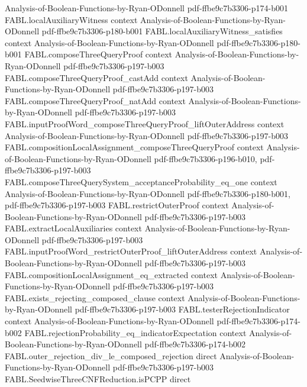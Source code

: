 \begin{theorem}
  {Analysis-of-Boolean-Functions-by-Ryan-ODonnell}
  {pdf-ffbe9c7b3306-p174-b001}
\proofstep
  {FABL.localAuxiliaryWitness}
  {context}
  {Analysis-of-Boolean-Functions-by-Ryan-ODonnell}
  {pdf-ffbe9c7b3306-p180-b001}
\proofstep
  {FABL.localAuxiliaryWitness_satisfies}
  {context}
  {Analysis-of-Boolean-Functions-by-Ryan-ODonnell}
  {pdf-ffbe9c7b3306-p180-b001}
\proofstep
  {FABL.composeThreeQueryProof}
  {context}
  {Analysis-of-Boolean-Functions-by-Ryan-ODonnell}
  {pdf-ffbe9c7b3306-p197-b003}
\proofstep
  {FABL.composeThreeQueryProof_castAdd}
  {context}
  {Analysis-of-Boolean-Functions-by-Ryan-ODonnell}
  {pdf-ffbe9c7b3306-p197-b003}
\proofstep
  {FABL.composeThreeQueryProof_natAdd}
  {context}
  {Analysis-of-Boolean-Functions-by-Ryan-ODonnell}
  {pdf-ffbe9c7b3306-p197-b003}
\proofstep
  {FABL.inputProofWord_composeThreeQueryProof_liftOuterAddress}
  {context}
  {Analysis-of-Boolean-Functions-by-Ryan-ODonnell}
  {pdf-ffbe9c7b3306-p197-b003}
\proofstep
  {FABL.compositionLocalAssignment_composeThreeQueryProof}
  {context}
  {Analysis-of-Boolean-Functions-by-Ryan-ODonnell}
  {pdf-ffbe9c7b3306-p196-b010,
    pdf-ffbe9c7b3306-p197-b003}
\proofstep
  {FABL.composeThreeQuerySystem_acceptanceProbability_eq_one}
  {context}
  {Analysis-of-Boolean-Functions-by-Ryan-ODonnell}
  {pdf-ffbe9c7b3306-p180-b001,
    pdf-ffbe9c7b3306-p197-b003}
\proofstep
  {FABL.restrictOuterProof}
  {context}
  {Analysis-of-Boolean-Functions-by-Ryan-ODonnell}
  {pdf-ffbe9c7b3306-p197-b003}
\proofstep
  {FABL.extractLocalAuxiliaries}
  {context}
  {Analysis-of-Boolean-Functions-by-Ryan-ODonnell}
  {pdf-ffbe9c7b3306-p197-b003}
\proofstep
  {FABL.inputProofWord_restrictOuterProof_liftOuterAddress}
  {context}
  {Analysis-of-Boolean-Functions-by-Ryan-ODonnell}
  {pdf-ffbe9c7b3306-p197-b003}
\proofstep
  {FABL.compositionLocalAssignment_eq_extracted}
  {context}
  {Analysis-of-Boolean-Functions-by-Ryan-ODonnell}
  {pdf-ffbe9c7b3306-p197-b003}
\proofstep
  {FABL.exists_rejecting_composed_clause}
  {context}
  {Analysis-of-Boolean-Functions-by-Ryan-ODonnell}
  {pdf-ffbe9c7b3306-p197-b003}
\proofstep
  {FABL.testerRejectionIndicator}
  {context}
  {Analysis-of-Boolean-Functions-by-Ryan-ODonnell}
  {pdf-ffbe9c7b3306-p174-b002}
\proofstep
  {FABL.rejectionProbability_eq_indicatorExpectation}
  {context}
  {Analysis-of-Boolean-Functions-by-Ryan-ODonnell}
  {pdf-ffbe9c7b3306-p174-b002}
\proofstep
  {FABL.outer_rejection_div_le_composed_rejection}
  {direct}
  {Analysis-of-Boolean-Functions-by-Ryan-ODonnell}
  {pdf-ffbe9c7b3306-p197-b003}
\proofstep
  {FABL.SeedwiseThreeCNFReduction.isPCPP}
  {direct}

\end{theorem}
